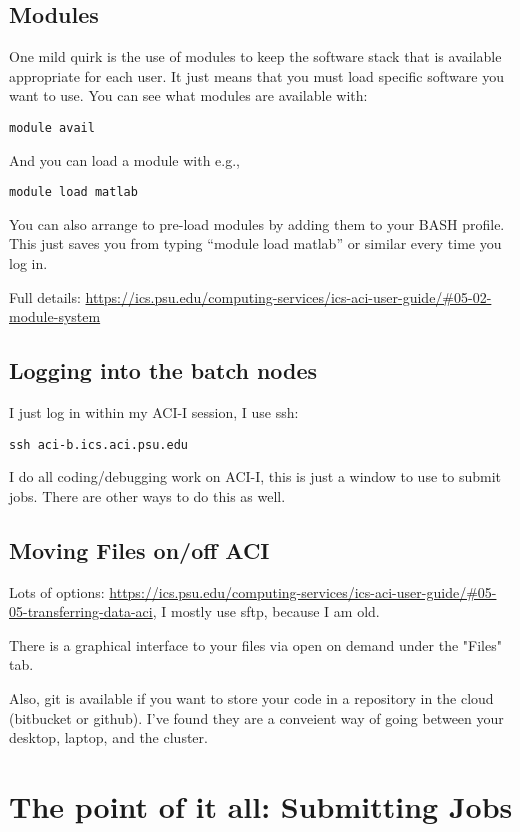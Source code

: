 \documentclass[twoside]{article}
\begin{document}
\subsection{Modules}
 
One mild quirk is the use of modules to keep the software stack that is available appropriate for each user. It just means that you must load specific software you want to use. You can see what modules are available with: 

\noindent
{\tt module avail }

And you can load a module with e.g., 

\noindent
{\tt module load matlab }

You can also arrange to pre-load modules by adding them to your BASH profile. This just saves you from typing ``module load matlab'' or similar every time you log in. 

Full details: \url{https://ics.psu.edu/computing-services/ics-aci-user-guide/#05-02-module-system}

\subsection{Logging into the batch nodes} 

I just log in within my ACI-I session, I use ssh: 

{\tt ssh aci-b.ics.aci.psu.edu }
 
I do all coding/debugging work on ACI-I, this is just a window to use to submit jobs.  There are other ways to do this as well. 

\subsection{Moving Files on/off ACI}

Lots of options: \url{https://ics.psu.edu/computing-services/ics-aci-user-guide/#05-05-transferring-data-aci}, I mostly use sftp, because I am old. 

There is a graphical interface to your files via open on demand under the "Files" tab. 

Also, git is available if you want to store your code in a repository in the cloud (bitbucket or github). I've found they are a conveient way of going between your desktop, laptop, and the cluster. 

\section{The point of it all: Submitting Jobs}
\end{document}
